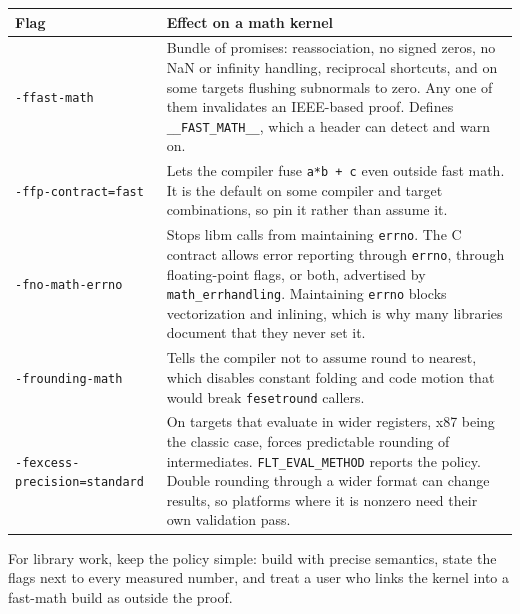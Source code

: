 \documentclass[manuscript, nonacm]{acmart}
\begin{document}
    \begin{table}[H]
        \centering
        \begin{tabular}{lp{8cm}}
            \toprule
            Flag & Effect on a math kernel \\
            \midrule
            \texttt{-ffast-math}
            & Bundle of promises: reassociation, no signed zeros, no NaN or
            infinity handling, reciprocal shortcuts, and on some targets
            flushing subnormals to zero. Any one of them invalidates an
            IEEE-based proof. Defines \texttt{\_\_FAST\_MATH\_\_}, which a
            header can detect and warn on. \\
            \texttt{-ffp-contract=fast}
            & Lets the compiler fuse \texttt{a*b + c} even outside fast math.
            It is the default on some compiler and target combinations, so
            pin it rather than assume it. \\
            \texttt{-fno-math-errno}
            & Stops libm calls from maintaining \texttt{errno}. The C
            contract allows error reporting through \texttt{errno}, through
            floating-point flags, or both, advertised by
            \texttt{math\_errhandling}. Maintaining \texttt{errno} blocks
            vectorization and inlining, which is why many libraries document
            that they never set it. \\
            \texttt{-frounding-math}
            & Tells the compiler not to assume round to nearest, which
            disables constant folding and code motion that would break
            \texttt{fesetround} callers. \\
            \texttt{-fexcess-precision=standard}
            & On targets that evaluate in wider registers, x87 being the
            classic case, forces predictable rounding of intermediates.
            \texttt{FLT\_EVAL\_METHOD} reports the policy. Double rounding
            through a wider format can change results, so platforms where it
            is nonzero need their own validation pass. \\
            \bottomrule
        \end{tabular}
    \end{table}
    \FloatBarrier

    For library work, keep the policy simple: build with precise semantics, state
    the flags next to every measured number, and treat a user who links the kernel
    into a fast-math build as outside the proof.
\end{document}
